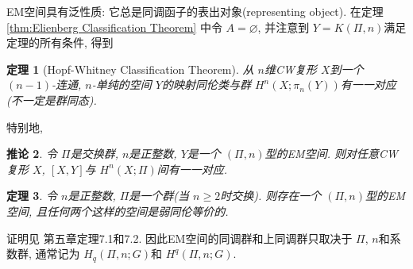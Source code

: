 \documentclass{ctexart}
\theoremstyle{plain}
\newtheorem{theorem}{定理}[section]
\newtheorem{corollary}[theorem]{推论}
\theoremstyle{definition}
\begin{document}
        EM空间具有泛性质: 它总是同调函子的表出对象(representing object). 在定理 \ref{thm:Elienberg Classification Theorem} 中令 $A=\varnothing$, 并注意到 $Y=K(\Pi,n)$满足定理的所有条件, 得到
        \begin{theorem}[Hopf-Whitney Classification Theorem]
            从 $n$维CW复形 $X$到一个 $(n-1)$-连通, $n$-单纯的空间 $Y$的映射同伦类与群 $H^{n}(X; \pi_{n}(Y))$有一一对应(不一定是群同态).
        \end{theorem}

        特别地, 
        \begin{corollary}
            \label{cor:correspondence of homotopy class with cohomology}
            令 $\Pi$是交换群, $n$是正整数, $Y$是一个 $(\Pi, n)$型的EM空间. 则对任意CW复形 $X$, $[X,Y]$与 $H^{n}(X; \Pi)$间有一一对应.
        \end{corollary}

        \begin{theorem}
            令 $n$是正整数, $\Pi$是一个群(当 $n\ge 2$时交换). 则存在一个 $(\Pi,n)$型的EM空间, 且任何两个这样的空间是弱同伦等价的.
        \end{theorem}
        证明见 \cite{Whitehead1978} 第五章定理7.1和7.2. 因此EM空间的同调群和上同调群只取决于 $\Pi$, $n$和系数群, 通常记为 $H_{q}(\Pi,n;G)$和 $H^{q}(\Pi,n;G)$.
        
\end{document}
